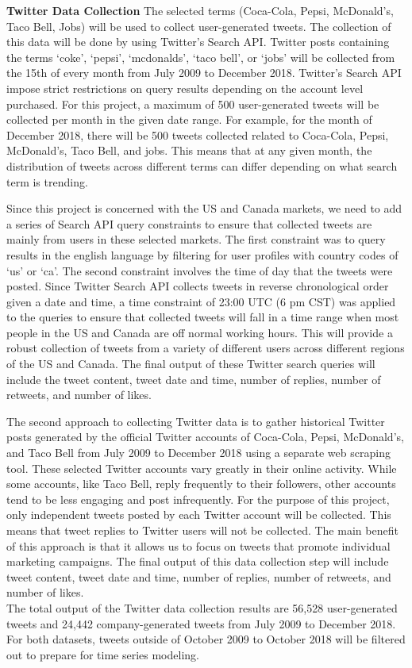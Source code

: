 \documentclass[12pt,oneside]{chicagocapstone}
\begin{document}
\textbf{Twitter Data Collection}
The selected terms (Coca-Cola, Pepsi, McDonald's, Taco Bell, Jobs) will be used to collect user-generated tweets. The collection of this data will be done by using Twitter's Search API. Twitter posts containing the terms `coke', `pepsi', `mcdonalds', `taco bell', or `jobs' will be collected from the 15th of every month from July 2009 to December 2018. Twitter's Search API impose strict restrictions on query results depending on the account level purchased. For this project, a maximum of 500 user-generated tweets will be collected per month in the given date range. For example, for the month of December 2018, there will be 500 tweets collected related to Coca-Cola, Pepsi, McDonald's, Taco Bell, and jobs. This means that at any given month, the distribution of tweets across different terms can differ depending on what search term is trending.

Since this project is concerned with the US and Canada markets, we need to add a series of Search API query constraints to ensure that collected tweets are mainly from users in these selected markets. The first constraint was to query results in the english language by filtering for user profiles with country codes of `us' or `ca'. The second constraint involves the time of day that the tweets were posted. Since Twitter Search API collects tweets in reverse chronological order given a date and time, a time constraint of 23:00 UTC (6 pm CST) was applied to the queries to ensure that collected tweets will fall in a time range when most people in the US and Canada are off normal working hours. This will provide a robust collection of tweets from a variety of different users across different regions of the US and Canada. The final output of these Twitter search queries will include the tweet content, tweet date and time, number of replies, number of retweets, and number of likes.

The second approach to collecting Twitter data is to gather historical Twitter posts generated by the official Twitter accounts of Coca-Cola, Pepsi, McDonald's, and Taco Bell from July 2009 to December 2018 using a separate web scraping tool. These selected Twitter accounts vary greatly in their online activity. While some accounts, like Taco Bell, reply frequently to their followers, other accounts tend to be less engaging and post infrequently. For the purpose of this project, only independent tweets posted by each Twitter account will be collected. This means that tweet replies to Twitter users will not be collected. The main benefit of this approach is that it allows us to focus on tweets that promote individual marketing campaigns. The final output of this data collection step will include tweet content, tweet date and time, number of replies, number of retweets, and number of likes.\\
The total output of the Twitter data collection results are 56,528 user-generated tweets and 24,442 company-generated tweets from July 2009 to December 2018. For both datasets, tweets outside of October 2009 to October 2018 will be filtered out to prepare for time series modeling.
\end{document}
